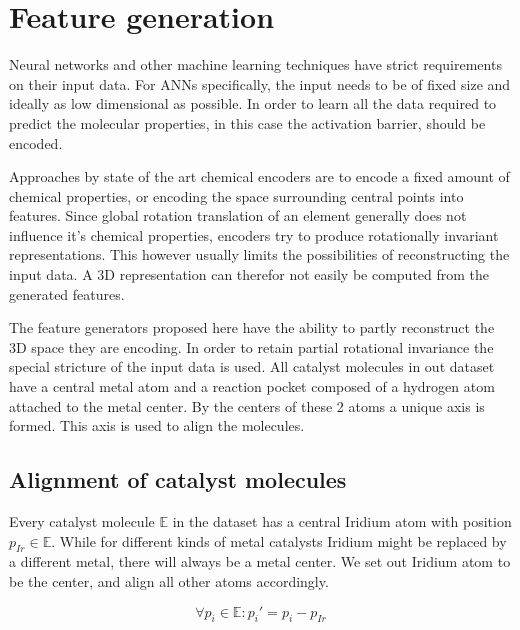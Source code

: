 
\chapter{Feature generation}
\label{ch:features}
Neural networks and other machine learning techniques have strict requirements on their input data.
For ANNs specifically, the input needs to be of fixed size and ideally as low dimensional as possible.
In order to learn all the data required to predict the molecular properties, in this case the activation barrier, should be encoded.

Approaches by state of the art chemical encoders are to encode a fixed amount of chemical properties,
or encoding the space surrounding central points into features.
Since global rotation translation of an element generally does not influence it's chemical properties, 
encoders try to produce rotationally invariant representations.
This however usually limits the possibilities of reconstructing the input data.
A 3D representation can therefor not easily be computed from the generated features.

The feature generators proposed here have the ability to partly reconstruct the 3D space they are encoding.
In order to retain partial rotational invariance the special stricture of the input data is used.
All catalyst molecules in out dataset have a central metal atom and a reaction pocket composed of a hydrogen atom attached to the metal center.
By the centers of these 2 atoms a unique axis is formed.
This axis is used to align the molecules.

\section{Alignment of catalyst molecules}

Every catalyst molecule $\mathbb{E}$ in the dataset has a central Iridium atom with position $p_{Ir} \in \mathbb{E}$.
While for different kinds of metal catalysts Iridium might be replaced by a different metal, there will always be a metal center.
We set out Iridium atom to be the center, and align all other atoms accordingly.

$$ \forall p_i \in \mathbb{E}: p_i' = p_i - p_{Ir}$$

